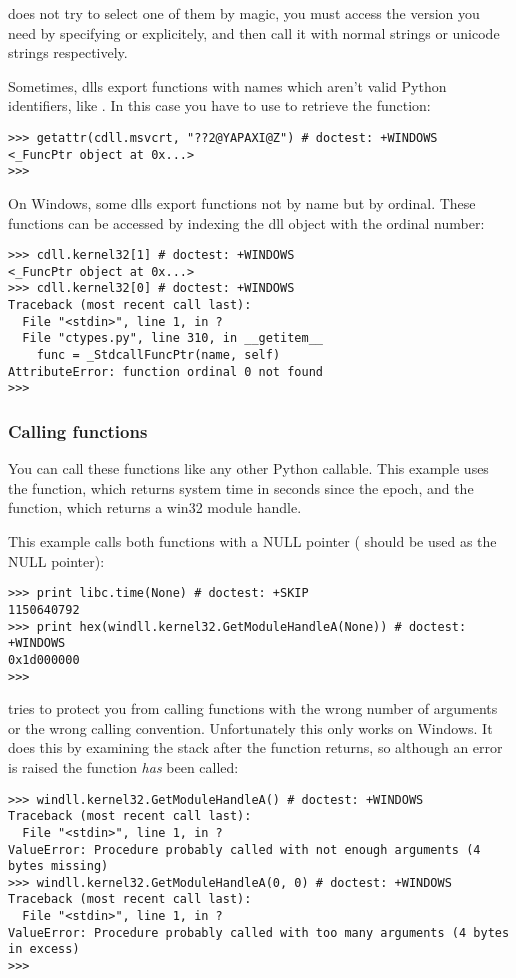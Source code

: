  does not try to select one of them by magic, you must
access the version you need by specifying  or
 explicitely, and then call it with normal strings
or unicode strings respectively.

Sometimes, dlls export functions with names which aren't valid Python
identifiers, like . In this case you have to use
 to retrieve the function:
\begin{verbatim}
>>> getattr(cdll.msvcrt, "??2@YAPAXI@Z") # doctest: +WINDOWS
<_FuncPtr object at 0x...>
>>>
\end{verbatim}

On Windows, some dlls export functions not by name but by ordinal.
These functions can be accessed by indexing the dll object with the
ordinal number:
\begin{verbatim}
>>> cdll.kernel32[1] # doctest: +WINDOWS
<_FuncPtr object at 0x...>
>>> cdll.kernel32[0] # doctest: +WINDOWS
Traceback (most recent call last):
  File "<stdin>", line 1, in ?
  File "ctypes.py", line 310, in __getitem__
    func = _StdcallFuncPtr(name, self)
AttributeError: function ordinal 0 not found
>>>
\end{verbatim}


\subsubsection{Calling functions\label{ctypes-calling-functions}}

You can call these functions like any other Python callable. This
example uses the  function, which returns system time in
seconds since the \UNIX{} epoch, and the  function,
which returns a win32 module handle.

This example calls both functions with a NULL pointer ( should
be used as the NULL pointer):
\begin{verbatim}
>>> print libc.time(None) # doctest: +SKIP
1150640792
>>> print hex(windll.kernel32.GetModuleHandleA(None)) # doctest: +WINDOWS
0x1d000000
>>>
\end{verbatim}

 tries to protect you from calling functions with the wrong
number of arguments or the wrong calling convention.  Unfortunately
this only works on Windows.  It does this by examining the stack after
the function returns, so although an error is raised the function
\emph{has} been called:
\begin{verbatim}
>>> windll.kernel32.GetModuleHandleA() # doctest: +WINDOWS
Traceback (most recent call last):
  File "<stdin>", line 1, in ?
ValueError: Procedure probably called with not enough arguments (4 bytes missing)
>>> windll.kernel32.GetModuleHandleA(0, 0) # doctest: +WINDOWS
Traceback (most recent call last):
  File "<stdin>", line 1, in ?
ValueError: Procedure probably called with too many arguments (4 bytes in excess)
>>>
\end{verbatim}

